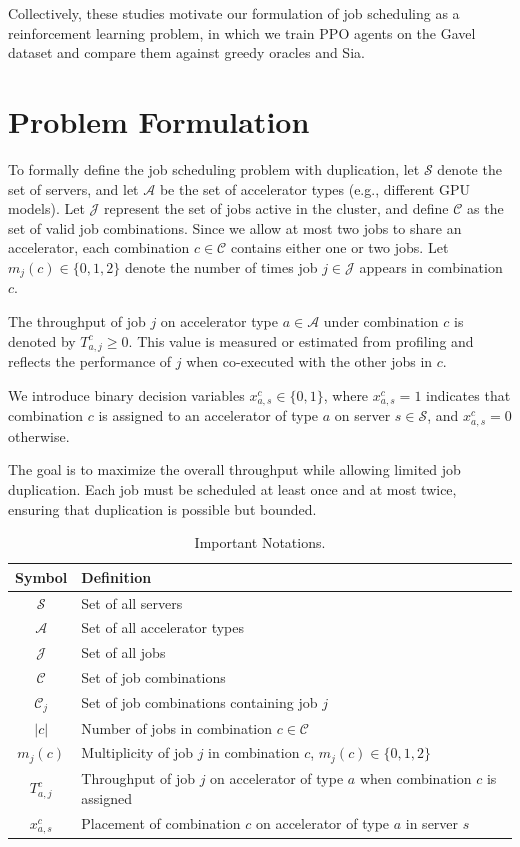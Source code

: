 \documentclass{article}
\begin{document}
Collectively, these studies motivate our formulation of job scheduling as a
reinforcement learning problem, in which we train PPO agents on the Gavel
dataset and compare them against greedy oracles and Sia.

\section{Problem Formulation}
To formally define the job scheduling problem with duplication, let $\mathcal{S}$ denote the set of servers, and let $\mathcal{A}$ be the set of accelerator types (e.g., different GPU models). Let $\mathcal{J}$ represent the set of jobs active in the cluster, and define $\mathcal{C}$ as the set of valid job combinations. Since we allow at most two jobs to share an accelerator, each combination $c \in \mathcal{C}$ contains either one or two jobs. Let $m_j(c) \in \{0,1,2\}$ denote the number of times job $j \in \mathcal{J}$ appears in combination $c$.

The throughput of job $j$ on accelerator type $a \in \mathcal{A}$ under combination $c$ is denoted by $T_{a,j}^c \geq 0$. This value is measured or estimated from profiling and reflects the performance of $j$ when co-executed with the other jobs in $c$.  

We introduce binary decision variables $x_{a,s}^c \in \{0,1\}$, where $x_{a,s}^c = 1$ indicates that combination $c$ is assigned to an accelerator of type $a$ on server $s \in \mathcal{S}$, and $x_{a,s}^c = 0$ otherwise.

The goal is to maximize the overall throughput while allowing limited job duplication. Each job must be scheduled at least once and at most twice, ensuring that duplication is possible but bounded.  

\begin{table}[t]
    \centering
    \caption{Important Notations.}
    \label{tab:notation}
    \fontsize{8}{9}\selectfont
    \begin{tabular}{|c|p{5.5cm}|} \hline
        \textbf{Symbol} & \textbf{Definition} \\ \hline\hline
        $\mathcal{S}$ & Set of all servers \\ \hline
        $\mathcal{A}$ & Set of all accelerator types \\ \hline
        $\mathcal{J}$ & Set of all jobs \\ \hline
        $\mathcal{C}$ & Set of job combinations \\ \hline
        $\mathcal{C}_{j}$ & Set of job combinations containing job $j$ \\ \hline
        $\vert c\vert$ & Number of jobs in combination $c\in\mathcal{C}$ \\ \hline
        $m_j(c)$ & Multiplicity of job $j$ in combination $c$, $m_j(c)\in\{0,1,2\}$ \\ \hline
        $T_{a,j}^{c}$ & Throughput of job $j$ on accelerator of type $a$ when combination $c$ is assigned \\ \hline
        $x_{a,s}^{c}$ & Placement of combination $c$ on accelerator of type $a$ in server $s$ \\ \hline
    \end{tabular}
\end{table}
\end{document}
